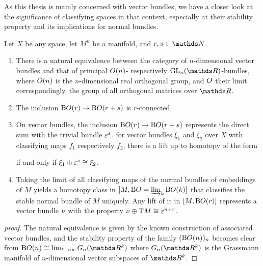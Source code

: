 As this thesis is mainly concerned with vector bundles, we have a
closer look at the significance of classifying spaces in that context,
especially at their stability property and its implications for normal
bundles.
\begin{Lem}\label{lem:classificationvb}
  Let $X$ be any space, let $M^n$ be a manifold, and $r,s\in\Nat$.
  \begin{enumerate}
  \item\label{item:vbcharacterisation}
    There is a natural equivalence between the category of
    $n$-dimensional vector bundles and that of principal
    $O(n)$- respectively $\GL n$-bundles, where $O(n)$ is the
    $n$-dimensional real orthogonal group, and $O$ their limit
    correspondingly, \idest the group of all orthogonal matrices over
    $\R$.
  \item\label{item:boincl}
    The inclusion $\mathrm{B}O(r)\to\mathrm{B}O(r+s)$ is $r$-connected.
  \item\label{item:bomaps}
    On vector bundles, the inclusion $\mathrm{B}O(r)\to\mathrm{B}O(r+s)$
    represents the direct sum with the trivial bundle $\varepsilon^s$.
    \Idest for vector bundles $\xi_1$ and $\xi_2$ over $X$ with
    classifying maps $f_1$ respectively $f_2$, there is a lift up to
    homotopy of the form
    \begin{center}
    \end{center}
    if and only if $\xi_1\oplus\varepsilon^{s}\cong\xi_2$.
  \item\label{item:charclsstablenormalbundle}
    Taking the limit of all classifying maps of the normal bundles of
    embeddings of $M$ yields a homotopy class in
    $[M,\mathrm{B}O=\varinjlim_{k}\mathrm{B}O(k)]$
    that classifies the stable normal bundle of $M$ uniquely.
    Any lift of it in $[M,\mathrm{B}O(r)]$ represents a vector bundle
    $\nu_{}$ with the property $\nu_{}\oplus\mathrm{T}M\cong\varepsilon^{n+r}$.
  \end{enumerate}  
  \begin{proof}[proof]
    The natural equivalence is given by the known construction of
    associated vector bundles, and the stability property of the
    family $(\mathrm{B}O(n))_n$ becomes clear from
    $\B\Orth(n)\cong\lim_{k\to\infty}G_n(\R^k)$ 
    where $G_n(\R^k)$ is the Grassmann manifold of $n$-dimensional
    vector subspaces of $\R^k$.


\end{proof}
\end{Lem}

